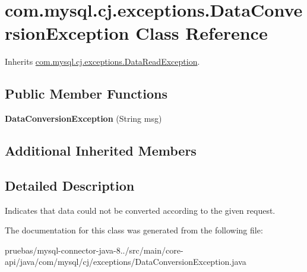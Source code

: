 \hypertarget{classcom_1_1mysql_1_1cj_1_1exceptions_1_1_data_conversion_exception}{}\section{com.\+mysql.\+cj.\+exceptions.\+Data\+Conversion\+Exception Class Reference}
\label{classcom_1_1mysql_1_1cj_1_1exceptions_1_1_data_conversion_exception}


Inherits \mbox{\hyperlink{classcom_1_1mysql_1_1cj_1_1exceptions_1_1_data_read_exception}{com.\+mysql.\+cj.\+exceptions.\+Data\+Read\+Exception}}.

\subsection*{Public Member Functions}
\begin{DoxyCompactItemize}
\item 
\mbox{\label{classcom_1_1mysql_1_1cj_1_1exceptions_1_1_data_conversion_exception_a6e03fb675925b05963e06649b68aea34}} 
{\bfseries Data\+Conversion\+Exception} (String msg)
\end{DoxyCompactItemize}
\subsection*{Additional Inherited Members}


\subsection{Detailed Description}
Indicates that data could not be converted according to the given request. 

The documentation for this class was generated from the following file\+:\begin{DoxyCompactItemize}
\item 
pruebas/mysql-\/connector-\/java-\/8../src/main/core-\/api/java/com/mysql/cj/exceptions/Data\+Conversion\+Exception.\+java\end{DoxyCompactItemize}
